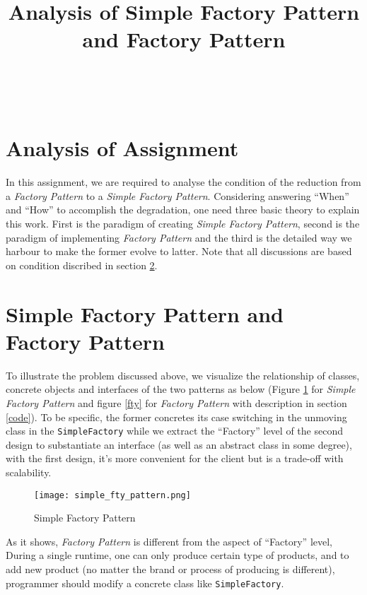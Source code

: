 \documentclass[a4paper]{article}
\title{Analysis of Simple Factory Pattern and Factory Pattern}
\makeatletter
\renewcommand{\maketitle}{\bgroup\setlength{\parindent}{0pt}
    \begin{center}

        \textbf{\huge\@title} \\[12pt]

        \par\vspace{\baselineskip}
    \end{center}

\egroup}
\makeatother
\begin{document}
\maketitle

\section{Analysis of Assignment}

In this assignment, we are required to analyse the condition of the reduction
from a \textit{Factory Pattern} to a \textit{Simple Factory Pattern}. Considering
answering ``When'' and ``How'' to accomplish the degradation, one need three
basic theory to explain this work. First is the paradigm of creating \textit{Simple Factory Pattern},
second is the paradigm of implementing \textit{Factory Pattern} and the third is
the detailed way we harbour to make the former evolve to latter. Note that all
discussions are based on condition discribed in section \ref{define}.

\section{Simple Factory Pattern and Factory Pattern}\label{define}

To illustrate the problem discussed above, we visualize the relationship
of classes, concrete objects and interfaces of the two patterns as below (Figure \ref{simple_fty}
for \textit{Simple Factory Pattern } and figure \ref{fty} for \textit{Factory Pattern} with description in
section \ref{code}). To be specific, the former concretes its case switching in
the unmoving class in the \texttt{SimpleFactory} while we extract the ``Factory'' level of
the second design to substantiate an interface (as well as an abstract class in some degree),
with the first design, it's more convenient for the client but is a trade-off with scalability.

\begin{figure}[h]
\begin{center}
\texttt{[image: simple\_fty\_pattern.png]}
\end{center}
\caption{Simple Factory Pattern}
\label{simple_fty}
\end{figure}

As it shows, \textit{Factory Pattern} is different from the aspect of ``Factory'' level,
During a single runtime, one can only produce certain type of products,
and to add new product (no matter the brand or process of producing is different), programmer should
modify a concrete class like \texttt{SimpleFactory}.
\end{document}
